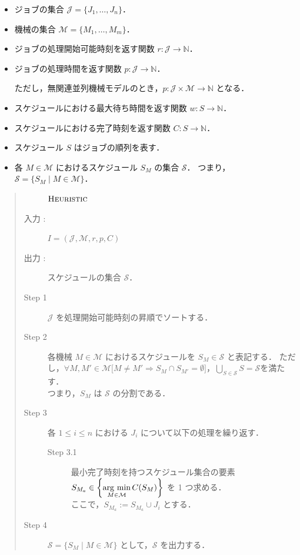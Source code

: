 \documentclass[12pt]{optlab-bachelor}
\newcommand{\argmin}{\mathop{\rm arg~min}\limits}
\begin{document}
\begin{itemize}
  \item ジョブの集合 $\mathcal{J} = \{J_1,\ldots,J_n\}$．
  \item 機械の集合 $\mathcal{M} = \{M_1,\ldots,M_m\}$．
  \item ジョブの処理開始可能時刻を返す関数 $r : \mathcal{J} \to \mathbb{N}$．
  \item ジョブの処理時間を返す関数 $p : \mathcal{J} \to \mathbb{N}$．

  ただし，無関連並列機械モデルのとき，$p : \mathcal{J} \times \mathcal{M} \to \mathbb{N}$ となる．
  \item スケジュールにおける最大待ち時間を返す関数 $w : S \to \mathbb{N}$．
  \item スケジュールにおける完了時刻を返す関数 $C : S \to \mathbb{N}$．
  \item スケジュール $S$ はジョブの順列を表す．
  \item 各 $M \in \mathcal{M}$ におけるスケジュール $S_M$ の集合 $\mathcal{S}$．
  つまり，$\mathcal{S} = \{S_M \mid M \in \mathcal{M}\}$．
\end{itemize}

\begin{quote}
  \begin{description}
    \item[] ${\mbox {\bf {\sc Heuristic}}}$
    \item[入力 :] $I = (\mathcal{J}, \mathcal{M},r,p,C)$
    \item[出力 :] スケジュールの集合 $\mathcal{S}$．
  \end{description}
  \begin{description}
    \item[Step 1]
    $\mathcal{J}$ を処理開始可能時刻の昇順でソートする．
    \item[Step 2]
    各機械 $M \in \mathcal{M}$ におけるスケジュールを $S_M \in \mathcal{S}$ と表記する．
    ただし，$\forall M, M' \in \mathcal{M}\big[M \neq M' \Rightarrow S_M \cap S_{M'} = \emptyset \big]$，$\displaystyle \bigcup_{S \in \mathcal{S}}S = \mathcal{S}$を満たす．
    \\ つまり，$S_M$ は $\mathcal{S}$ の分割である．
    \item[Step 3]
    各 $1 \le i \le n$ における $J_i$ について以下の処理を繰り返す．
    \begin{description}
      \item[Step 3.1]
      最小完了時刻を持つスケジュール集合の要素 \\ $S_{M_a} \in {\displaystyle \left\{\argmin_{M \in \mathcal{M}}C(S_M)\right\}}$ を 1 つ求める．
      \\ ここで，$S_{M_a} := S_{M_a} \cup J_i$ とする．
    \end{description}
    \item[Step 4]
    $\mathcal{S} = \{ S_M \mid M \in \mathcal{M}\}$ として，$\mathcal{S}$ を出力する．
  \end{description}
\end{quote}
\end{document}
